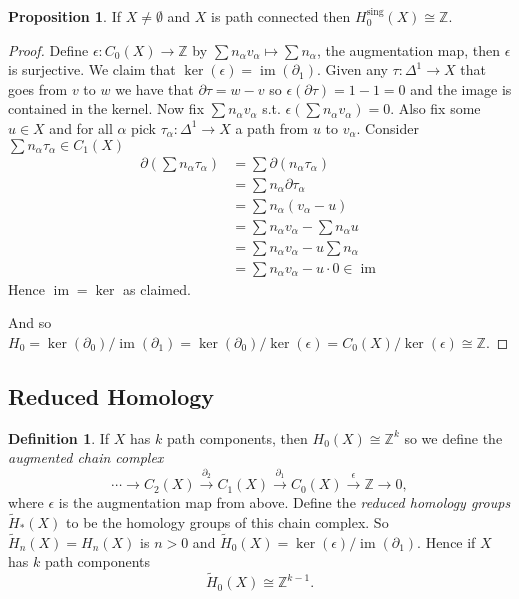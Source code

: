 \documentclass[12pt]{article}
\theoremstyle{definition}
\newtheorem*{prop}{Proposition}
\theoremstyle{definition}
\newtheorem*{defn}{Definition}
\newcommand{\ZZ}{\mathbb{Z}}
\renewcommand{\H}{H_*}
\DeclareMathOperator{\im}{im}
\begin{document}
\begin{prop}
If $X \ne \emptyset$ and $X$ is path connected then $H_0^\text{sing}(X) \cong \ZZ$.
\end{prop}
\begin{proof}
Define $\epsilon\colon C_0(X) \to \ZZ$ by $\sum n_\alpha v_\alpha \mapsto \sum n_\alpha$, the augmentation map, then $\epsilon$ is surjective.
We claim that $\ker(\epsilon) = \im(\partial_1)$.
Given any $\tau\colon \Delta^1 \to X$ that goes from $v$ to $w$ we have that $\partial\tau = w-v$ so $\epsilon(\partial \tau) = 1-1 =0$ and the image is contained in the kernel.
Now fix $\sum n_\alpha v_\alpha$ s.t. $\epsilon(\sum n_\alpha v_\alpha) = 0$.
Also fix some $u\in X$ and for all $\alpha$ pick $\tau_\alpha\colon\Delta^1 \to X$ a path from $u$ to $v_\alpha$.
Consider $\sum n_\alpha \tau_\alpha\in C_1 (X)$
\begin{align*}
\partial\left(\sum n_\alpha \tau_\alpha\right) &= \sum \partial(n_\alpha \tau_\alpha)\\
&= \sum n_\alpha\partial\tau_\alpha\\
&= \sum n_\alpha(v_\alpha - u) \\
&= \sum n_\alpha v_\alpha - \sum n_\alpha u \\
&= \sum n_\alpha v_\alpha - u\sum n_\alpha \\
&= \sum n_\alpha v_\alpha -u\cdot 0\in \im
\end{align*}
Hence $\im = \ker$ as claimed.

And so $H_0 = \ker(\partial_0)/\im(\partial_1) = \ker(\partial_0)/\ker(\epsilon) = C_0(X) /\ker(\epsilon) \cong \ZZ$.
\end{proof}

\subsection{Reduced Homology}
\begin{defn}
If $X$ has $k$ path components, then $H_0(X) \cong \ZZ^k$ so we define the \emph{augmented chain complex}
\[
\cdots \to C_2(X) \xrightarrow{\partial_2}C_1(X) \xrightarrow{\partial_1}C_0(X) \xrightarrow{\epsilon} \ZZ \to 0,
\]
where $\epsilon$ is the augmentation map from above.
Define the \emph{reduced homology groups} $\tilde \H (X)$ to be the homology groups of this chain complex.
So $\tilde H_n(X) = H_n(X)$ is $n> 0$ and $\tilde H_0(X) = \ker(\epsilon)/\im(\partial_1)$.
Hence if $X$ has $k$ path components
\[
\tilde H_0(X) \cong \ZZ^{k-1}.
\]
\end{defn}
\end{document}
